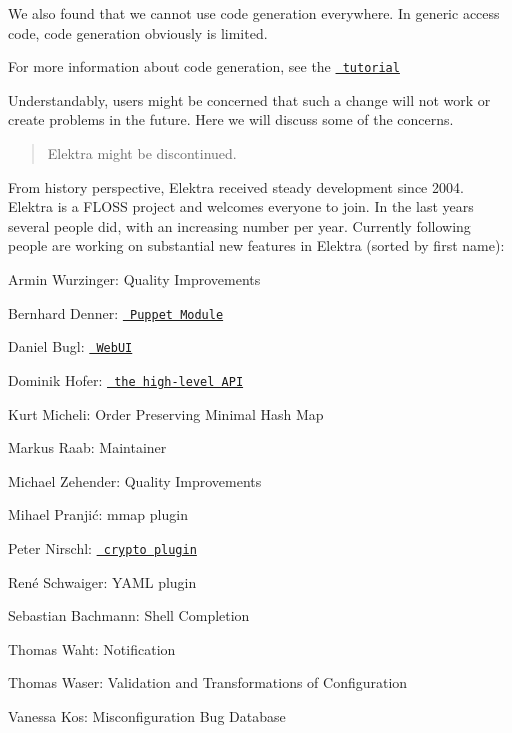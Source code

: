 We also found that we cannot use code generation everywhere. In generic access code, code generation obviously is limited.


\begin{DoxyItemize}
\item For more information about code generation, see the \href{https://www.libelektra.org/tools/gen}{\texttt{ tutorial}}
\end{DoxyItemize}

Understandably, users might be concerned that such a change will not work or create problems in the future. Here we will discuss some of the concerns.

\begin{quote}
Elektra might be discontinued. \end{quote}


From history perspective, Elektra received steady development since 2004. Elektra is a F\+L\+O\+SS project and welcomes everyone to join. In the last years several people did, with an increasing number per year. Currently following people are working on substantial new features in Elektra (sorted by first name)\+:


\begin{DoxyItemize}
\item Armin Wurzinger\+: Quality Improvements
\item Bernhard Denner\+: \href{https://github.com/ElektraInitiative/puppet-libelektra}{\texttt{ Puppet Module}}
\item Daniel Bugl\+: \href{https://www.libelektra.org/tools/web}{\texttt{ Web\+UI}}
\item Dominik Hofer\+: \href{https://www.libelektra.org/decisions/high-level-api}{\texttt{ the high-\/level A\+PI}}
\item Kurt Micheli\+: Order Preserving Minimal Hash Map
\item Markus Raab\+: Maintainer
\item Michael Zehender\+: Quality Improvements
\item Mihael Pranjić\+: mmap plugin
\item Peter Nirschl\+: \href{https://www.libelektra.org/plugins/crypto}{\texttt{ crypto plugin}}
\item René Schwaiger\+: Y\+A\+ML plugin
\item Sebastian Bachmann\+: Shell Completion
\item Thomas Waht\+: Notification
\item Thomas Waser\+: Validation and Transformations of Configuration
\item Vanessa Kos\+: Misconfiguration Bug Database
\end{DoxyItemize}

